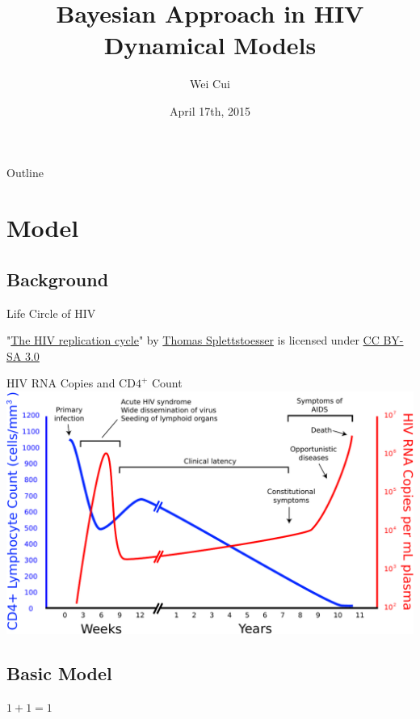 \documentclass[9pt]{beamer}
\title[Bayesian Approach in HIV Dynamical Models]{Bayesian Approach in HIV Dynamical Models}
\author[Wei Cui]{Wei Cui  { \texttt{}}}
\institute{~\\Department of Statistics \\University of California, Riverside}
\date{\small{April 17th, 2015}}
\begin{document}



\begin{frame} %
  \titlepage
\end{frame} %

\begin{frame}{Outline} %
  \tableofcontents
\end{frame} %

\section[Model]{Model}
\subsection[Background]{Background}
\begin{frame}{Life Circle of HIV}
  \begin{figure}
    \centering
    \def\svgwidth{\columnwidth}
    
  \end{figure}
"\href{http://en.wikipedia.org/wiki/HIV\#/media/File:HIV-replication-cycle.svg}{The HIV replication cycle}" by \href{http://commons.wikimedia.org/wiki/User:Splette}{Thomas Splettstoesser} is licensed under \href{http://creativecommons.org/licenses/by-sa/3.0/}{CC BY-SA 3.0}
\end{frame}

\begin{frame}{HIV RNA Copies and CD$4^{+}$ Count}
  \includegraphics[scale=0.5]{Hiv-timecourse_copy}
\end{frame}

\subsection[BasicModel]{Basic Model}
\begin{frame}
$1+1=1$
\end{frame}
\end{document}
